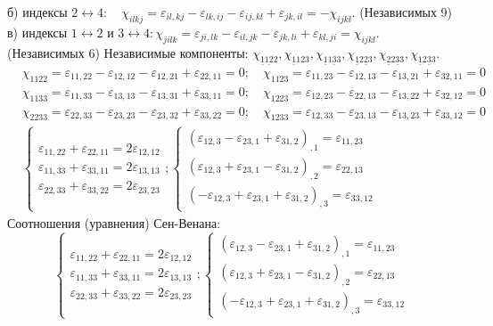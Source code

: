 б) индексы $2 \leftrightarrow 4: \quad \chi_{i l k j}=\varepsilon_{i l, k j}-\varepsilon_{l k, i j}-\varepsilon_{i j, k l}+\varepsilon_{j k, i l}=-\chi_{i j k l}$. (Независимых 9)
в) индексы $1 \leftrightarrow 2$ и $3 \leftrightarrow 4: \chi_{j i l k}=\varepsilon_{j i, l k}-\varepsilon_{i l, j k}-\varepsilon_{j k, l i}+\varepsilon_{k l, j i}=\chi_{i j k l}$. (Независимых 6)
Независимые компоненты: $\chi_{\underline{1} \underline{12} 2}, \chi_{\underline{1} 123}, \chi_{\underline{1} 1 \underline{3} 3}, \chi_{\underline{1} 2 \underline{2} 3}, \chi_{\underline{2} 2 \underline{3} 3}, \chi_{\underline{1} 2 \underline{3} 3}$.
$$
\begin{aligned}
& \chi_{1122}=\varepsilon_{11,22}-\varepsilon_{12,12}-\varepsilon_{12,21}+\varepsilon_{22,11}=0 ; \quad \chi_{1123}=\varepsilon_{11,23}-\varepsilon_{12,13}-\varepsilon_{13,21}+\varepsilon_{32,11}=0 \\
& \chi_{1133}=\varepsilon_{11,33}-\varepsilon_{13,13}-\varepsilon_{13,31}+\varepsilon_{33,11}=0 ; \quad \chi_{1223}=\varepsilon_{12,23}-\varepsilon_{22,13}-\varepsilon_{13,22}+\varepsilon_{32,12}=0 \\
& \chi_{2233}=\varepsilon_{22,33}-\varepsilon_{23,23}-\varepsilon_{23,32}+\varepsilon_{33,22}=0 ; \quad \chi_{1233}=\varepsilon_{12,33}-\varepsilon_{23,13}-\varepsilon_{13,23}+\varepsilon_{33,12}=0 \\
& \left\{\begin{array}{l}
\varepsilon_{11,22}+\varepsilon_{22,11}=2 \varepsilon_{12,12} \\
\varepsilon_{11,33}+\varepsilon_{33,11}=2 \varepsilon_{13,13} \\
\varepsilon_{22,33}+\varepsilon_{33,22}=2 \varepsilon_{23,23}
\end{array} ;\left\{\begin{array}{l}
\left(\varepsilon_{12,3}-\varepsilon_{23,1}+\varepsilon_{31,2}\right)_{, 1}=\varepsilon_{11,23} \\
\left(\varepsilon_{12,3}+\varepsilon_{23,1}-\varepsilon_{31,2}\right)_{, 2}=\varepsilon_{22,13} \\
\left(-\varepsilon_{12,3}+\varepsilon_{23,1}+\varepsilon_{31,2}\right)_{, 3}=\varepsilon_{33,12}
\end{array}\right.\right. 
\end{aligned}
$$
Соотношения
(уравнения)
Сен-Венана:
$$
\left\{\begin{array}{l}
\varepsilon_{11,22}+\varepsilon_{22,11}=2 \varepsilon_{12,12} \\
\varepsilon_{11,33}+\varepsilon_{33,11}=2 \varepsilon_{13,13} \\
\varepsilon_{22,33}+\varepsilon_{33,22}=2 \varepsilon_{23,23}
\end{array} ;\left\{\begin{array}{l}
\left(\varepsilon_{12,3}-\varepsilon_{23,1}+\varepsilon_{31,2}\right)_{, 1}=\varepsilon_{11,23} \\
\left(\varepsilon_{12,3}+\varepsilon_{23,1}-\varepsilon_{31,2}\right)_{, 2}=\varepsilon_{22,13} \\
\left(-\varepsilon_{12,3}+\varepsilon_{23,1}+\varepsilon_{31,2}\right)_{, 3}=\varepsilon_{33,12}
\end{array}\right.\right.
$$


